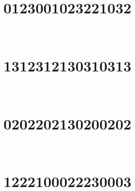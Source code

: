 
\section{0123001023221032}

\marginnote[3\baselineskip]{\centering}



\,
\newline
\vspace{1.2cm}

\section{1312312130310313}

\marginnote[3\baselineskip]{\centering}



\,
\newline
\vspace{1.2cm}

\section{0202202130200202}

\marginnote[3\baselineskip]{\centering}



\,
\newline
\vspace{1.2cm}

\section{1222100022230003}

\marginnote[3\baselineskip]{\centering}



\,
\newline
\vspace{1.2cm}

